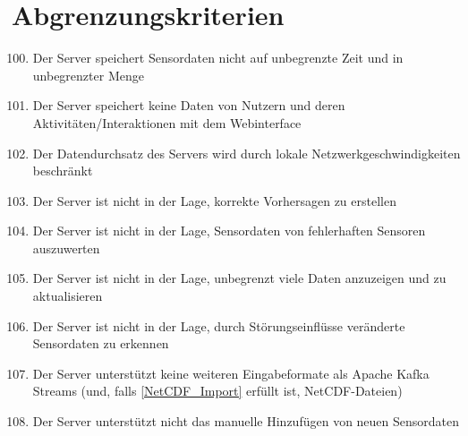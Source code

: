 \section{Abgrenzungskriterien}
\begin{enumerate}[label=\textbf{AK\arabic{enumi}0}]
	\setcounter{enumi}{99}
	\item Der Server speichert Sensordaten nicht auf unbegrenzte Zeit und in unbegrenzter Menge
	\item Der Server speichert keine Daten von Nutzern und deren Aktivitäten/Interaktionen mit dem Webinterface
	\item Der Datendurchsatz des Servers wird durch lokale Netzwerkgeschwindigkeiten beschränkt
	\item Der Server ist nicht in der Lage, korrekte Vorhersagen zu erstellen
	\item Der Server ist nicht in der Lage, Sensordaten von fehlerhaften Sensoren auszuwerten
	\item Der Server ist nicht in der Lage, unbegrenzt viele Daten anzuzeigen und zu aktualisieren
	\item Der Server ist nicht in der Lage, durch Störungseinflüsse veränderte Sensordaten zu erkennen
	\item Der Server unterstützt keine weiteren Eingabeformate als Apache Kafka Streams (und, falls \ref{NetCDF_Import} erfüllt ist, NetCDF-Dateien)
	\item Der Server unterstützt nicht das manuelle Hinzufügen von neuen Sensordaten
\end{enumerate}